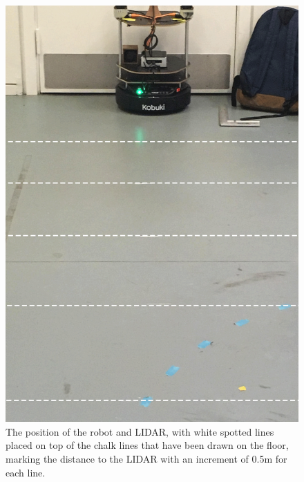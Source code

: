 \begin{figure}[H]
\begin{minipage}[b]{0.45\linewidth}
        \includegraphics[width=\textwidth]{figures/AccuracySetupPs.png}
        \caption{The position of the robot and LIDAR, with white spotted lines placed on top  of the chalk lines that have been drawn on the floor, marking the distance to the LIDAR with an increment of 0.5m for each line.}
        \label{fig:AccuracySetup2}
    \end{minipage}
\end{figure}



